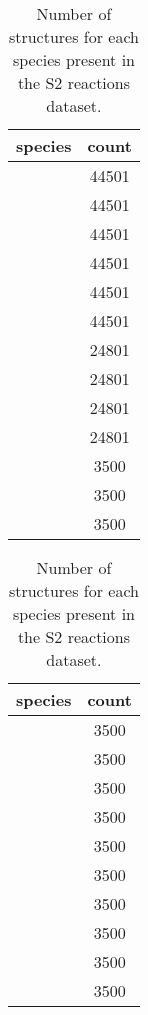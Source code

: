 \documentclass[12pt]{article}
\begin{document}
\begin{table}[htbp]
\footnotesize
\centering
\caption[Number of structures in the S2 reactions
  dataset]{Number of structures for each species present in the
  S2 reactions dataset.}
\label{tab:sn2_dataset_composition}
\begin{tabular}{l c }
	\toprule
		\textbf{species} & \textbf{count} \\
	\midrule
	 \phantom{} & \num{44501}\\
	\addlinespace[1pt]
	 \phantom{} & \num{44501}\\
	\addlinespace[1pt]
	 \phantom{} & \num{44501}\\
	\addlinespace[1pt]
	 \phantom{} & \num{44501}\\
	\addlinespace[1pt]
	 \phantom{} & \num{44501}\\
	\addlinespace[1pt]
	 \phantom{}  & \num{44501}\\
	\addlinespace[1pt]
	 \phantom{} & \num{24801}\\
	\addlinespace[1pt]
	 \phantom{} & \num{24801}\\
	\addlinespace[1pt]
	 \phantom{} & \num{24801}\\
	\addlinespace[1pt]
	 \phantom{} & \num{24801}\\
	\addlinespace[1pt]
	 \phantom{} & \num{3500}\\
	\addlinespace[1pt]
	 \phantom{} & \num{3500}\\
	\addlinespace[1pt]
	 \phantom{} & \num{3500}\\
	\bottomrule
\end{tabular}
\begin{tabular}{l c }
	\toprule
	\textbf{species} & \textbf{count} \\
	\midrule
	 \phantom{} & \num{3500}\\
	\addlinespace[1pt]
	 \phantom{}  & \num{3500}\\
	\addlinespace[1pt]
	 \phantom{} & \num{3500}\\
	\addlinespace[1pt]
	 \phantom{} & \num{3500}\\
	\addlinespace[1pt]
	 \phantom{}  & \num{3500}\\
	\addlinespace[1pt]
	 \phantom{} & \num{3500}\\
	\addlinespace[1pt]
	 \phantom{} & \num{3500}\\
	\addlinespace[1pt]
	 \phantom{} & \num{3500}\\
	\addlinespace[1pt]
	 \phantom{} & \num{3500}\\
	\addlinespace[1pt]
	 \phantom{}  & \num{3500}\\

\end{tabular}
\end{table}
\end{document}
